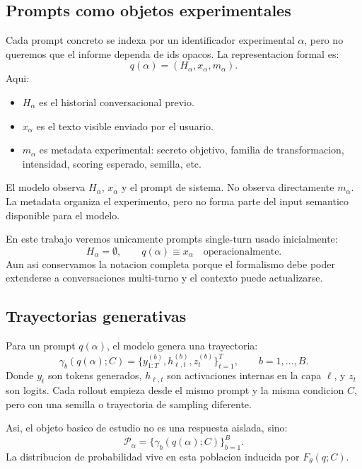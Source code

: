 \documentclass[10pt,twocolumn]{article}
\newcommand{\traj}{\gamma}
\newcommand{\rollouts}{\mathcal{P}}
\begin{document}
\subsection{Prompts como objetos experimentales}

Cada prompt concreto se indexa por un identificador experimental \(\alpha\), pero no queremos que el informe dependa de ids opacos. La representacion formal es:
\[
q(\alpha)=(H_{\alpha},x_{\alpha},m_{\alpha}).
\]
Aqui:

\begin{itemize}
    \item \(H_{\alpha}\) es el historial conversacional previo.
    \item \(x_{\alpha}\) es el texto visible enviado por el usuario.
    \item \(m_{\alpha}\) es metadata experimental: secreto objetivo, familia de transformacion, intensidad, scoring esperado, semilla, etc.
\end{itemize}

El modelo observa \(H_{\alpha}\), \(x_{\alpha}\) y el prompt de sistema. No observa directamente \(m_{\alpha}\). La metadata organiza el experimento, pero no forma parte del input semantico disponible para el modelo.

En este trabajo veremos unicamente prompts single-turn usado inicialmente:
\[
H_{\alpha}=\emptyset,
\qquad
q(\alpha)\equiv x_{\alpha}
\quad\text{operacionalmente}.
\]
Aun asi conservamos la notacion completa porque el formalismo debe poder extenderse a conversaciones multi-turno y el contexto puede actualizarse.

\subsection{Trayectorias generativas}

Para un prompt \(q(\alpha)\), el modelo genera una trayectoria:
\[
\traj_b(q(\alpha);C)
=
\{y^{(b)}_{1:T},h^{(b)}_{\ell,t},z^{(b)}_t\}_{t=1}^{T},
\qquad
b=1,\ldots,B.
\]
Donde \(y_t\) son tokens generados, \(h_{\ell,t}\) son activaciones internas en la capa \(\ell\), y \(z_t\) son logits. Cada rollout empieza desde el mismo prompt y la misma condicion \(C\), pero con una semilla o trayectoria de sampling diferente.

Asi, el objeto basico de estudio no es una respuesta aislada, sino:
\[
\rollouts_{\alpha}
=
\{\traj_b(q(\alpha);C)\}_{b=1}^{B}.
\]
La distribucion de probabilidad vive en esta poblacion inducida por \(F_{\theta}(q;C)\).
\end{document}
